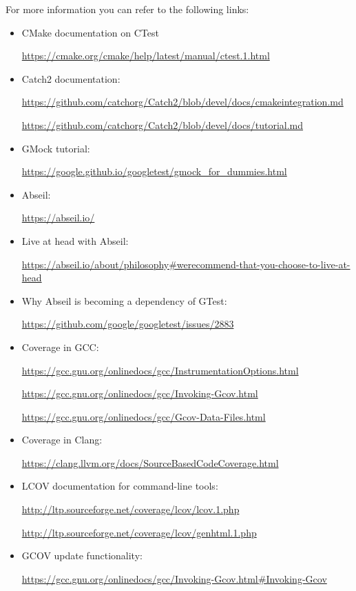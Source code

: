 For more information you can refer to the following links:

\begin{itemize}
\item 
CMake documentation on CTest

\url{https://cmake.org/cmake/help/latest/manual/ctest.1.html}

\item 
Catch2 documentation:

\url{https://github.com/catchorg/Catch2/blob/devel/docs/cmakeintegration.md}

\url{https://github.com/catchorg/Catch2/blob/devel/docs/tutorial.md}

\item 
GMock tutorial: 

\url{https://google.github.io/googletest/gmock\_for\_dummies.html}

\item 
Abseil: 

\url{https://abseil.io/}

\item 
Live at head with Abseil:

\url{https://abseil.io/about/philosophy\#werecommend-that-you-choose-to-live-at-head}

\item 
Why Abseil is becoming a dependency of GTest:

\url{https://github.com/google/googletest/issues/2883}

\item 
Coverage in GCC:

\url{https://gcc.gnu.org/onlinedocs/gcc/InstrumentationOptions.html}

\url{https://gcc.gnu.org/onlinedocs/gcc/Invoking-Gcov.html}

\url{https://gcc.gnu.org/onlinedocs/gcc/Gcov-Data-Files.html}

\item 
Coverage in Clang: 

\url{https://clang.llvm.org/docs/SourceBasedCodeCoverage.html}

\item 
LCOV documentation for command-line tools:

\url{http://ltp.sourceforge.net/coverage/lcov/lcov.1.php}

\url{http://ltp.sourceforge.net/coverage/lcov/genhtml.1.php}

\item 
GCOV update functionality: 

\url{ https://gcc.gnu.org/onlinedocs/gcc/Invoking-Gcov.html\#Invoking-Gcov}
\end{itemize}